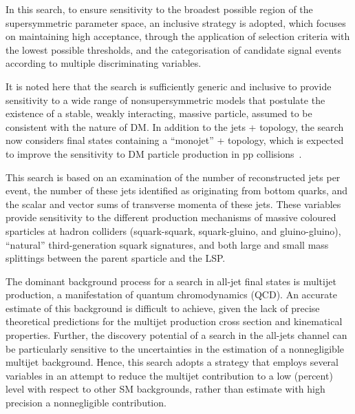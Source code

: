 In this search, to ensure sensitivity to the broadest possible region
of the supersymmetric parameter space, an inclusive strategy is
adopted, which focuses on maintaining high acceptance, through the
application of selection criteria with the lowest possible thresholds,
and the categorisation of candidate signal events according to
multiple discriminating variables. 

It is noted here that the search is sufficiently generic and inclusive
to provide sensitivity to a wide range of nonsupersymmetric models
that postulate the existence of a stable, weakly interacting, massive
particle, assumed to be consistent with the nature of DM. In addition
to the jets + \ptvecmiss topology, the search now considers final
states containing a ``monojet'' + \ptvecmiss topology, which is
expected to improve the sensitivity to DM particle production in pp
collisions~\cite{Fox:2012ee, Buchmueller:2015eea}. 

This search is based on an examination of the number of reconstructed
jets per event, the number of these jets identified as originating
from bottom quarks, and the scalar and vector sums of transverse
momenta of these jets. These variables provide sensitivity to the
different production mechanisms of massive coloured sparticles at
hadron colliders (\ie squark-squark, squark-gluino, and
gluino-gluino), ``natural'' third-generation squark signatures, and
both large and small mass splittings between the parent sparticle and
the LSP.

The dominant background process for a search in all-jet final states
is multijet production, a manifestation of quantum chromodynamics
(QCD). An accurate estimate of this background is difficult to
achieve, given the lack of precise theoretical predictions for the
multijet production cross section and kinematical properties.
Further, the discovery potential of a search in the all-jets channel
can be particularly sensitive to the uncertainties in the estimation
of a nonnegligible multijet background. Hence, this search adopts a
strategy that employs several variables in an attempt to reduce the
multijet contribution to a low (percent) level with respect to other
SM backgrounds, rather than estimate with high precision a
nonnegligible contribution.

